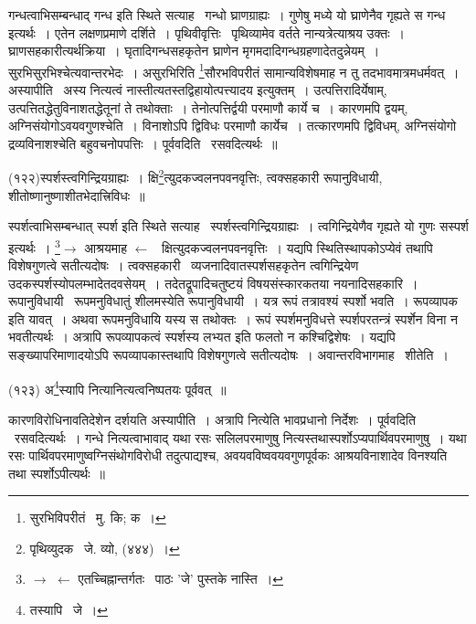 \documentclass[11pt, openany]{book}
\begin{document}
{गन्धत्वाभिसम्बन्धाद् गन्ध इति स्थिते सत्याह \textendash\ {\knu गन्धो घ्राणग्राह्यः~।} गुणेषु मध्ये यो घ्राणेनैव गृह्यते स गन्ध इत्यर्थः~। एतेन लक्षणप्रमाणे दर्शिते~। {\knu पृथिवीवृत्तिः} \textendash\ पृथिव्यामेव वर्तते नान्यत्रेत्याश्रय उक्तः~। {\knu घ्राणसहकारी}त्यर्थक्रिया~। घृतादिगन्धसहकृतेन घ्राणेन मृगमदादिगन्धग्रहणादेतदुन्नेयम्~। {\knu सुरभिसुरभि}श्चेत्यवान्तरभेदः~। असुरभिरिति \renewcommand{\thefootnote}{2}\footnote{सुरभिविपरीतं \textendash\ मु. कि; क~।}सौरभविपरीतं सामान्यविशेषमाह न तु तदभावमात्रमधर्मवत्~। {\knu अस्यापीति} \textendash\ अस्य नित्यत्वं नास्तीत्यतस्तद्विहायोत्पत्त्यादय इत्युक्तम्~। उत्पत्तिरादिर्येषाम्, उत्पत्तितद्धेतुविनाशतद्धेतूनां ते तथोक्ताः~। तेनोत्पत्तिर्द्वयी परमाणौ कार्ये च~। कारणमपि द्वयम्, अग्निसंयोगोऽवयवगुणश्चेति~। विनाशोऽपि द्विविधः परमाणौ कार्येच~। तत्कारणमपि द्विविधम्, अग्निसंयोगो द्रव्यविनाशश्चेति बहुवचनोपपत्तिः~। {\knu पूर्ववदिति} \textendash\ रसवदित्यर्थः~॥

\hangindent=2cm {\knu (१२२)स्पर्शस्त्वगिन्द्रियग्राह्यः~। क्षि\renewcommand{\thefootnote}{3}\footnote{पृथिव्युदक \textendash\ जे. व्यो, (४४४)~।}त्युदकज्वलनपवनवृत्तिः, त्वक्सहकारी रूपानुविधायी, शीतोष्णानुष्णाशीतभेदात्त्रिविधः~॥}

स्पर्शत्वाभिसम्बन्धात् स्पर्श इति स्थिते सत्याह \textendash\ {\knu स्पर्शस्त्वगिन्द्रियग्राह्यः~।} त्वगिन्द्रियेणैव गृह्यते यो गुणः सस्पर्श इत्यर्थः~। \renewcommand{\thefootnote}{4}\footnote{$\rightarrow$ $\leftarrow$ एतच्चिह्नान्तर्गतः \textendash\ पाठः 'जे' पुस्तके नास्ति~।}$\rightarrow$ आश्रयमाह $\leftarrow$ \textendash\ {\knu क्षित्युदकज्वलनपवनवृत्तिः~।} यद्यपि स्थितिस्थापकोऽप्येवं तथापि विशेषगुणत्वे सतीत्यदोषः~। {\knu त्वक्सहकारी} \textendash\ व्यजनादिवातस्पर्शसहकृतेन त्वगिन्द्रियेण उदकस्पर्शस्योपलम्भादेतदवसेयम्~। तदेतद्रूपादिचतुष्टयं विषयसंस्कारकतया नयनादिसहकारि~। {\knu रूपानुविधायी} \textendash\ रूपमनुविधातुं शीलमस्येति रूपानुविधायी~। यत्र रूपं तत्रावश्यं स्पर्शो भवति~। रूपव्यापक इति यावत्~। अथवा रूपमनुविधायि यस्य स तथोक्तः~। रूपं स्पर्शमनुविधत्ते स्पर्शपरतन्त्रं स्पर्शेन विना न भवतीत्यर्थः~। अत्रापि रूपव्यापकत्वं स्पर्शस्य लभ्यत इति फलतो न कश्चिद्विशेषः~। यद्यपि सङ्ख्यापरिमाणादयोऽपि रूपव्यापकास्तथापि विशेषगुणत्वे सतीत्यदोषः~। अवान्तरविभागमाह \textendash\ शीतेति~।

{\knu (१२३) अ\renewcommand{\thefootnote}{5}\footnote{तस्यापि \textendash\ जे~।}स्यापि नित्यानित्यत्वनिष्पतयः पूर्ववत्~॥}

\newpage
कारणविरोधिनावतिदेशेन दर्शयति {\knu अस्यापीति~।} अत्रापि नित्येति भावप्रधानो निर्देशः~। {\knu पूर्ववदिति} \textendash\ रसवदित्यर्थः~। गन्धे नित्यत्वाभावाद् यथा रसः सलिलपरमाणुषु नित्यस्तथास्पर्शोऽप्यपार्थिवपरमाणुषु~। यथा रसः पार्थिवपरमाणुष्वग्निसंथोगविरोधी तदुत्पाद्यश्च, अवयवविष्ववयवगुणपूर्वकः आश्रयविनाशादेव विनश्यति तथा स्पर्शोऽपीत्यर्थः~॥

}
\end{document}
